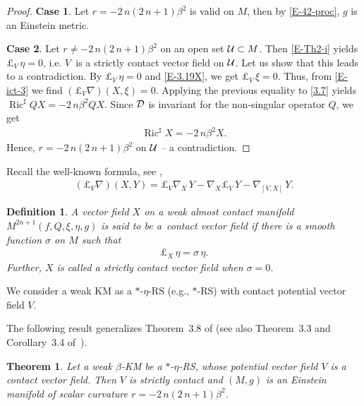 \documentclass[11pt,a4paper,twoside]{article}
\newtheorem{theorem}{Theorem}%
\newtheorem{definition}{Definition}%
\def\Ric{\operatorname{Ric}}
\begin{document}
{\begin{proof}
\textbf{Case 1}. Let
${r}=-2\,n(2\,n+1)\beta^2$ is valid on $M$, then by \eqref{E-42-proc}, $g$ is an Einstein metric.

\textbf{Case 2}. Let ${r}\ne-2\,n(2\,n+1)\beta^2$ on an open set ${\cal U}\subset M$.
Then \eqref{E-Th2-i} yields $\pounds_V\,\eta = 0$, i.e. $V$~is a strictly contact vector field on ${\cal U}$.
Let us show that this leads to a contradiction.
By $\pounds_V\,\eta = 0$ and \eqref{E-3.19X}, we get $\pounds_V\,\xi=0$.
Thus, from \eqref{E-ict-3} we find $(\pounds_V\nabla)(X,\xi)=0$.
Applying the previous equality to \eqref{3.7} yields $ \Ric^\sharp QX = - 2\,n\beta^2 QX$.
Since ${\cal D}$ is invariant for the non-singular operator $Q$, we get
\begin{align*}%
 \Ric^\sharp X = - 2\,n\beta^2 X .
\end{align*}
Hence, ${r}=-2\,n(2\,n+1)\beta^2$ on ${\cal U}$ -- a contradiction.
\end{proof}


Recall the well-known formula, see \cite{ven-2022},
\begin{align}\label{E-ict-2}
 (\pounds_V\nabla)(X,Y) = \pounds_V\nabla_X\,Y - \nabla_X\pounds_V\,Y -\nabla_{[V,X]}\,Y  .
\end{align}


\begin{definition}\rm
A vector field $X$ on a weak almost contact manifold $M^{2n+1}({f},Q,\xi,\eta,g)$ is said to be a~\textit{contact vector field} if there is a smooth function $\sigma$ on $M$ such that
\begin{align}\label{E-ict-1}
 \pounds_X\,\eta = \sigma\,\eta .
\end{align}
Further, $X$ is called a \textit{strictly contact vector field} when $\sigma = 0$.
\end{definition}

We consider a weak KM as a $\ast$-$\eta$-RS (e.g., $\ast$-RS) with contact potential vector field $V$.

The following result generalizes Theorem~3.8 of \cite{ven-2022} (see also Theorem~3.3 and Corollary~3.4 of~\cite{DSB-2024}).

\begin{theorem}\label{T-002a}
Let a weak $\beta$-KM be a $\ast$-$\eta$-RS, whose potential vector field $V$ is a contact vector field.
Then $V$ is strictly contact and $(M, g)$ is an Einstein manifold of scalar curvature ${r}=-2\,n(2\,n{+}1)\beta^2$.
\end{theorem}

}
\end{document}
